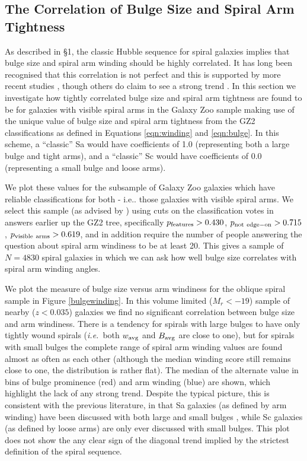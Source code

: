 \documentclass[usenatbib]{mn2e}
\newcommand{\ie}{{\it i.e.}}
\begin{document}
\subsection{The Correlation of Bulge Size and Spiral Arm Tightness}

As described in \S 1, the classic Hubble sequence for spiral galaxies implies that bulge size and spiral arm winding should be highly correlated. It has long been recognised that this correlation is not perfect \citep[e.g.][]{1970ApJ...160..811F, kennicutt1981} and this is supported by more recent studies \citep{Hart2017b,Hart2018}, though others do claim to see a strong trend \citep{Davis2015}. In this section we investigate how tightly correlated bulge size and spiral arm tightness are found to be for galaxies with visible spiral arms in the Galaxy Zoo sample making use of the unique value of bulge size and spiral arm tightness from the GZ2 classifications as defined in Equations \ref{eqn:winding} and \ref{eqn:bulge}. In this scheme, a ``classic'' Sa would have coefficients of 1.0 (representing both a large bulge and tight arms), and a ``classic'' Sc would have coefficients of 0.0 (representing a small bulge and loose arms). 

We plot these values for the subsample of Galaxy Zoo galaxies which have reliable classifications for both - i.e.. those galaxies with visible spiral arms. We select this sample (as advised by \citealt{Willett2013}) using cuts on the classification votes in answers earlier up the GZ2 tree, specifically $p_{\rm features} > 0.430$, $p_{\rm not~edge-on} > 0.715$, $p_{\rm visible~arms} > 0.619$, and in addition require the number of people answering the question about spiral arm windiness to be at least 20. This gives a sample of $N = 4830$ spiral galaxies in which we can ask how well bulge size correlates with spiral arm winding angles.
 
 We plot the measure of bulge size versus arm windiness for the oblique spiral sample in Figure \ref{bulgewinding}. In this volume limited ($M_r<-19$) sample of nearby ($z<0.035$) galaxies we find no significant correlation between bulge size and arm windiness. There is a tendency for spirals with large bulges to have only tightly wound spirals (\ie ~both $w_{\rm avg}$ and $B_{\rm avg}$ are close to one), but for spirals with small bulges the complete range of spiral arm winding values are found almost as often as each other (although the median winding score still remains close to one, the distribution is rather flat). The median of the alternate value in bins of bulge prominence (red) and arm winding (blue) are shown, which highlight the lack of any strong trend. Despite the typical picture, this is consistent with the previous literature, in that Sa galaxies (as defined by arm winding) have been discussed with both large and small bulges \citep[e.g.][]{Hogg1993}, while Sc galaxies (as defined by loose arms) are only ever discussed with small bulges. This plot does not show the any clear sign of the diagonal trend implied by the strictest definition of the spiral sequence. 
\end{document}
